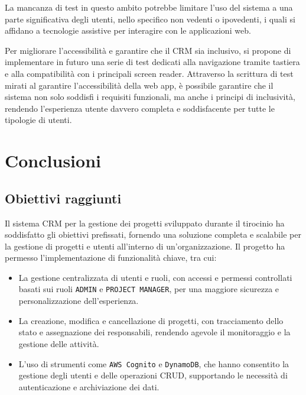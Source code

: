 \documentclass[target=bach,aauheader=,style=]{thud}
\begin{document}
\noindent La mancanza di test in questo ambito potrebbe limitare l'uso del sistema a una parte significativa degli utenti, nello specifico non vedenti o ipovedenti, i quali si affidano a tecnologie assistive per interagire con le applicazioni web. 

\noindent Per migliorare l'accessibilità e garantire che il CRM sia inclusivo, si propone di implementare in futuro una serie di test dedicati alla navigazione tramite tastiera e alla compatibilità con i principali screen reader. Attraverso la scrittura di test mirati al garantire l'accessibilità della web app, è possibile garantire che il sistema non solo soddisfi i requisiti funzionali, ma anche i principi di inclusività, rendendo l'esperienza utente davvero completa e soddisfacente per tutte le tipologie di utenti.



\chapter{Conclusioni}

\section{Obiettivi raggiunti}
Il sistema CRM per la gestione dei progetti sviluppato durante il tirocinio ha soddisfatto gli obiettivi prefissati, fornendo una soluzione completa e scalabile per la gestione di progetti e utenti all'interno di un'organizzazione. Il progetto ha permesso l'implementazione di funzionalità chiave, tra cui:
\begin{itemize}
    \item La gestione centralizzata di utenti e ruoli, con accessi e permessi controllati basati sui ruoli \texttt{ADMIN} e \texttt{PROJECT MANAGER}, per una maggiore sicurezza e personalizzazione dell'esperienza.
    \item La creazione, modifica e cancellazione di progetti, con tracciamento dello stato e assegnazione dei responsabili, rendendo agevole il monitoraggio e la gestione delle attività.
    \item L'uso di strumenti come \texttt{AWS Cognito} e \texttt{DynamoDB}, che hanno consentito la gestione degli utenti e delle operazioni CRUD, supportando le necessità di autenticazione e archiviazione dei dati.
\end{itemize}
\end{document}
